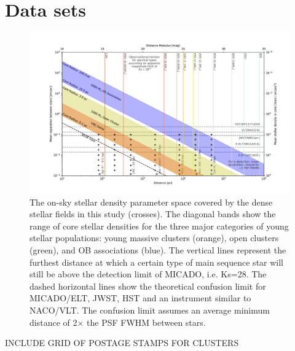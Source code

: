 \section{Data sets}
\label{sec:observations}


\begin{figure}

    \centering
    \includegraphics[width=\textwidth]{images/resolved_stellar_densities}

    \caption{The on-sky stellar density parameter space covered by the dense stellar fields in this study (crosses). 
    The diagonal bands show the range of core stellar densities for the three major categories of young stellar populations: young massive clusters (orange), open clusters (green), and OB associations (blue). 
    The vertical lines represent the furthest distance at which a certain type of main sequence star will still be above the detection limit of MICADO, i.e. Ks=28\m.
    The dashed horizontal lines show the theoretical confusion limit for MICADO/ELT, JWST, HST and an instrument similar to NACO/VLT. The confusion limit assumes an average minimum distance of 2$\times$ the PSF FWHM between stars.
    }
    
    \label{fig:resolved_stellar_densities}
    
\end{figure}

\rewrite INCLUDE GRID OF POSTAGE STAMPS FOR CLUSTERS


